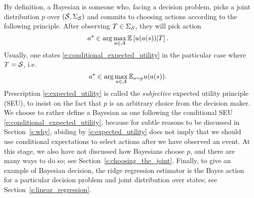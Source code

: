 By definition, a Bayesian is someone who, facing a decision problem, picks a joint distribution $p$ over $(\mathcal{S}, \Sigma_{\mathcal{S}})$ and commits to choosing actions according to the following principle.
After observing $T\in\Sigma_{\mathcal{S}}$, they will pick action
\begin{equation}
    a^\star \in \arg\max_{a\in\mathcal{A}} \mathbb{E} \left [ u(a(s)) | T \right ].
    \label{e:conditional_expected_utility}
\end{equation}
Usually, one states \eqref{e:conditional_expected_utility} in the particular case where $T=\mathcal{S}$, i.e.
\begin{equation}
    a^\star \in \arg\max_{a\in\mathcal{A}} \mathbb{E}_{s\sim p} u(a(s)).
    \label{e:expected_utility}
\end{equation}
Prescription \eqref{e:expected_utility} is called the \emph{subjective} expected utility principle (SEU),
to insist on the fact that $p$ is an arbitrary choice from the decision maker.
We choose to rather define a Bayesian as one following the conditional SEU \eqref{e:conditional_expected_utility}, because for subtle reasons to be discussed in Section~\ref{s:why}, abiding by \eqref{e:expected_utility} does not imply that we should use conditional expectations to select actions after we have observed an event. 
At this stage, we also have not discussed how Bayesians choose $p$, and there are many ways to do so; see Section~\ref{s:choosing_the_joint}.
Finally, to give an example of Bayesian decision, the ridge regression estimator is the Bayes action for a particular decision problem and joint distribution over states; see Section~\ref{s:linear_regression}.


